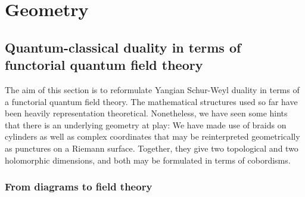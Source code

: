 \documentclass[11pt]{report}
\theoremstyle{definition}
\theoremstyle{remark}
\theoremstyle{remark}
\begin{document}

\chapter{Geometry}\label{chapter:geometry}

\section{Quantum-classical duality in terms of functorial quantum field theory}

The aim of this section is to reformulate Yangian Schur-Weyl duality in terms of a functorial quantum field theory. The mathematical structures used so far have been heavily representation theoretical. Nonetheless, we have seen some hints that there is an underlying geometry at play: We have made use of braids on cylinders as well as complex coordinates that may be reinterpreted geometrically as punctures on a Riemann surface. Together, they give two topological and two holomorphic dimensions, and both may be formulated in terms of cobordisms.

\subsection{From diagrams to field theory}
\end{document}
